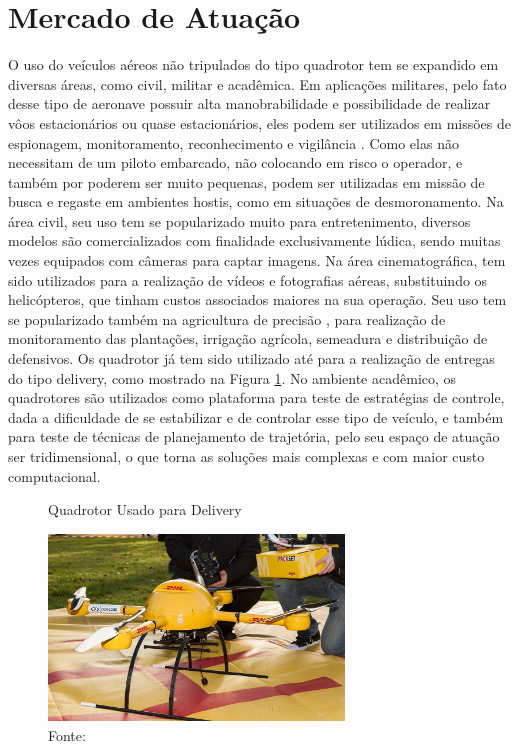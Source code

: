 \section{Mercado de Atuação}

O uso do veículos aéreos não tripulados do tipo quadrotor tem se expandido em diversas áreas, como civil, militar e acadêmica. Em aplicações militares, pelo fato desse tipo de aeronave possuir alta manobrabilidade e possibilidade de realizar vôos estacionários ou quase estacionários, eles podem ser utilizados em missões de espionagem, monitoramento, reconhecimento e vigilância \cite{Nonami2010a,Hassanalian2017a}. Como elas não necessitam de um piloto embarcado, não colocando em risco o operador, e também por poderem ser muito pequenas, podem ser utilizadas em missão de busca e regaste em ambientes hostis, como em situações de desmoronamento. Na área civil, seu uso tem se popularizado muito para entretenimento, diversos modelos são comercializados com finalidade exclusivamente lúdica, sendo muitas vezes equipados com câmeras para captar imagens. Na área cinematográfica, tem sido utilizados para a realização de vídeos e fotografias aéreas, substituindo os helicópteros, que tinham custos associados maiores na sua operação. Seu uso tem se popularizado também na agricultura de precisão \cite{Mogili2018}, para realização de monitoramento das plantações, irrigação agrícola, semeadura e distribuição de defensivos. Os quadrotor já tem sido utilizado até para a realização de entregas do tipo delivery, como mostrado na Figura \ref{fig:delivery}. No ambiente acadêmico, os quadrotores são utilizados como plataforma para teste de estratégias de controle, dada a dificuldade de se estabilizar e de controlar esse tipo de veículo, e também para teste de técnicas de planejamento de trajetória, pelo seu espaço de atuação ser tridimensional, o que torna as soluções mais complexas e com maior custo computacional.

\begin{figure} [h!]	
  \centering
  {
  \caption{Quadrotor Usado para Delivery}
  \includegraphics[width=0.7\textwidth]{Figures/Package_copter_microdrones_dhl.jpg}
  \caption*{Fonte: \cite{delivery}}
  \label{fig:delivery}
  }
\end{figure}

